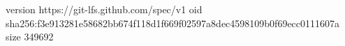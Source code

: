 version https://git-lfs.github.com/spec/v1
oid sha256:f3e913281e58682bb674f118d1f669f02597a8dec4598109b0f69ecc0111607a
size 349692
